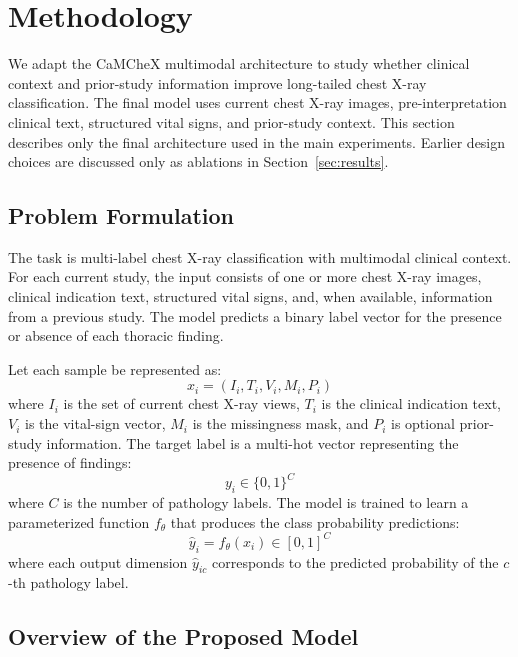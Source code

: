
\section{Methodology}
\label{sec:methodology}

We adapt the CaMCheX multimodal architecture to study whether clinical context and prior-study information improve long-tailed chest X-ray classification. The final model uses current chest X-ray images, pre-interpretation clinical text, structured vital signs, and prior-study context. This section describes only the final architecture used in the main experiments. Earlier design choices are discussed only as ablations in Section~\ref{sec:results}.

\subsection{Problem Formulation}
\label{subsec:method_problem}

The task is multi-label chest X-ray classification with multimodal clinical context. For each current study, the input consists of one or more chest X-ray images, clinical indication text, structured vital signs, and, when available, information from a previous study. The model predicts a binary label vector for the presence or absence of each thoracic finding.

Let each sample be represented as:
\begin{equation}
    x_i = (I_i, T_i, V_i, M_i, P_i)
\end{equation}
where \(I_i\) is the set of current chest X-ray views, \(T_i\) is the clinical indication text, \(V_i\) is the vital-sign vector, \(M_i\) is the missingness mask, and \(P_i\) is optional prior-study information. The target label is a multi-hot vector representing the presence of findings:
\begin{equation}
    y_i \in \{0,1\}^{C}
\end{equation}
where \(C\) is the number of pathology labels. The model is trained to learn a parameterized function \(f_\theta\) that produces the class probability predictions:
\begin{equation}
    \hat{y}_i = f_\theta(x_i) \in [0,1]^C
\end{equation}
where each output dimension \(\hat{y}_{ic}\) corresponds to the predicted probability of the \(c\)-th pathology label.

\subsection{Overview of the Proposed Model}
\label{subsec:method_overview}

